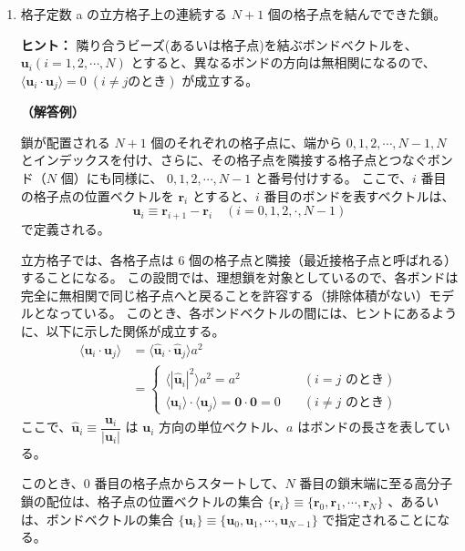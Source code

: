 \documentclass[uplatex,dvipdfmx,a4paper,11pt]{jsarticle}
\begin{document}
\newpage

\begin{enumerate}
\setlength{\parskip}{0cm} %
\setlength{\itemsep}{0.5cm} %

\item
格子定数 a の立方格子上の連続する $N + 1$ 個の格子点を結んでできた鎖。

\vspace{10pt}
\begin{itembox}[l]{{\bf ヒント：}}
隣り合うビーズ(あるいは格子点)を結ぶボンドベクトルを、$\bm{u}_i (i = 1, 2, \cdots, N)$ とすると、異なるボンドの方向は無相関になるので、
$\langle \bm{u}_i \cdot \bm{u}_j \rangle = 0 \; ( i \neq j \text{のとき})$ が成立する。
\end{itembox}

\vspace{10pt}

{\bf （解答例）}

鎖が配置される $N+1$ 個のそれぞれの格子点に、端から $0, 1, 2, \cdots, N-1, N$ とインデックスを付け、さらに、その格子点を隣接する格子点とつなぐボンド（$N$ 個）にも同様に、 $0, 1, 2, \cdots, N-1$ と番号付けする。
ここで、$i$ 番目の格子点の位置ベクトルを $\bm{r}_i$ とすると、$i$ 番目のボンドを表すベクトルは、
\begin{equation*}
\bm{u}_i \equiv \bm{r}_{i+1} -\bm{r}_i \quad (i=0, 1, 2, \cdot, N-1)
\end{equation*}
で定義される。

立方格子では、各格子点は 6 個の格子点と隣接（最近接格子点と呼ばれる）することになる。
この設問では、理想鎖を対象としているので、各ボンドは完全に無相関で同じ格子点へと戻ることを許容する（排除体積がない）モデルとなっている。
このとき、各ボンドベクトルの間には、ヒントにあるように、以下に示した関係が成立する。
\begin{align*}
\langle \bm{u}_i \cdot \bm{u}_j \rangle 
	&= \langle \bm{\hat{u}}_i \cdot \bm{\hat{u}}_j \rangle a^2 \\
	&=
\begin{cases}
\langle |\bm{\hat{u}}_i |^2 \rangle a^2 = a^2	&\quad (\text{$i = j$ のとき}) \\
\langle \bm{u}_i \rangle \cdot \langle \bm{u}_j \rangle = \bm{0}\cdot\bm{0} = 0	&\quad(\text{$i \neq j$ のとき})
\end{cases}
\end{align*}
ここで、$\bm{\hat{u}}_i \equiv \dfrac{\bm{u}_i}{|\bm{u}_i|}$ は $\bm{u}_i$ 方向の単位ベクトル、$a$ はボンドの長さを表している。

このとき、$0$ 番目の格子点からスタートして、$N$ 番目の鎖末端に至る高分子鎖の配位は、格子点の位置ベクトルの集合 $\{\bm{r}_i\} \equiv \{ \bm{r}_0, \bm{r}_1, \cdots, \bm{r}_N \}$ 、あるいは、ボンドベクトルの集合 $\{\bm{u}_i\} \equiv \{ \bm{u}_0, \bm{u}_1, \cdots, \bm{u}_{N-1} \}$ で指定されることになる。



\end{enumerate}
\end{document}
